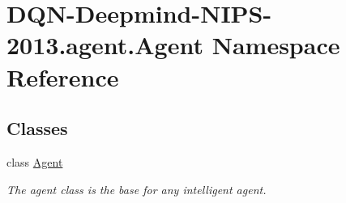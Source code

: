 \hypertarget{namespaceDQN-Deepmind-NIPS-2013_1_1agent_1_1Agent}{}\section{D\+Q\+N-\/\+Deepmind-\/\+N\+I\+P\+S-\/2013.agent.\+Agent Namespace Reference}
\label{namespaceDQN-Deepmind-NIPS-2013_1_1agent_1_1Agent}
\subsection*{Classes}
\begin{DoxyCompactItemize}
\item 
class \hyperlink{classDQN-Deepmind-NIPS-2013_1_1agent_1_1Agent_1_1Agent}{Agent}
\begin{DoxyCompactList}\small\item\em The agent class is the base for any intelligent agent. \end{DoxyCompactList}\end{DoxyCompactItemize}
